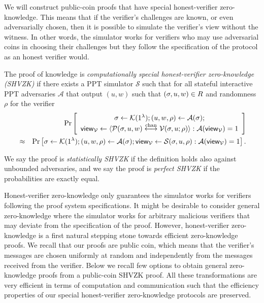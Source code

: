 We will construct public-coin proofs that have special honest-verifier zero-knowledge. This means that if the verifier's challenges are known, or even adversarially chosen, then it is possible to simulate the verifier's view without the witness.  In other words, the simulator works for verifiers who may use adversarial coins in choosing their challenges but they follow the specification of the protocol as an honest verifier would. 
\begin{definition}
The proof of knowledge is \emph{computationally special honest-verifier zero-knowledge (SHVZK)} if there exists a PPT simulator $\mathcal{S}$ such that for all stateful interactive PPT adversaries $\mathcal{A}$ that output $(u,w)$ such that $(\mathsf{\sigma},u,w)\in R$ and randomness $\rho$ for the verifier
\begin{eqnarray*}
&&\Pr \left[ \begin{array}{c}\mathsf{\sigma}\gets \mathcal{K}(1^{\lambda});(u, w, \rho) \leftarrow\mathcal{A}(\mathsf{\sigma}); \\
\mathsf{view}_{\mathcal{V}}\leftarrow \langle \mathcal{P}(\mathsf{\sigma},u,w)\overset{\textnormal{chan}}{\longleftrightarrow} \mathcal{V}(\mathsf{\sigma},u;\rho)\rangle: \mathcal{A}(\mathsf{view}_{\mathcal{V}})=1\end{array} \right]\\
&\approx &\Pr \left[ \mathsf{\sigma}\gets \mathcal{K}(1^{\lambda});(u, w, \rho) \leftarrow\mathcal{A}(\mathsf{\sigma}); \mathsf{view}_{\mathcal{V}}\leftarrow \mathcal{S}(\mathsf{\sigma},u,\rho): \mathcal{A}(\mathsf{view}_{\mathcal{V}})=1\right].
\end{eqnarray*}

We say the proof is \emph{statistically SHVZK} if the definition holds also against unbounded adversaries, and we say the proof is \emph{perfect SHVZK} if the probabilities are exactly equal.
\end{definition}


Honest-verifier zero-knowledge only guarantees the simulator works for verifiers following the proof system specifications. It might be desirable to consider general zero-knowledge where the simulator works for arbitrary malicious verifiers that may deviate from the specification of the proof. However, honest-verifier zero-knowledge is a first natural stepping stone towards efficient zero-knowledge proofs. %
 We recall that our proofs are public coin, which means that the verifier's messages are chosen uniformly at random and independently from the messages received from the verifier. Below we recall few options to obtain general zero-knowledge proofs from a public-coin SHVZK proof. All these transformations are very efficient in terms of computation and communication such that the efficiency properties of our special honest-verifier zero-knowledge protocols are preserved. 

